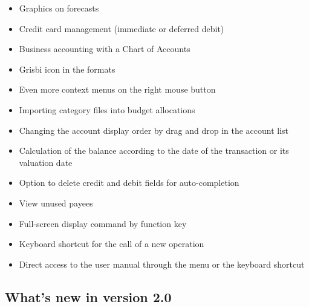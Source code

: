 \begin{itemize}%
	\item Graphics on forecasts
	\item Credit card management (immediate or deferred debit)
	\item Business accounting with a Chart of Accounts
	\item Grisbi icon in the  formats 
	\item Even more context menus on the right mouse button
	\item Importing category files into budget allocations
	\item Changing the account display order by drag and drop in the account list
	\item Calculation of the balance according to the date of the transaction or its valuation date
	\item Option to delete credit and debit fields for auto-completion
	\item View unused payees
	\item Full-screen display command by function key 
	\item Keyboard shortcut   for the call of a new operation
	\item Direct access to the user manual through the menu  or the keyboard shortcut  
\end{itemize}

\subsection{What's new in version 2.0}

